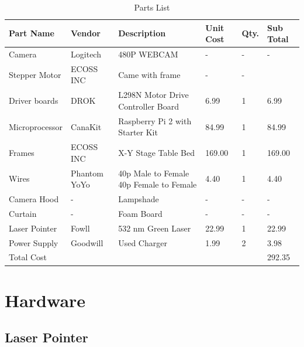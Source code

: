 \begin{table}[ht!]
\begin{center}	
\caption{Parts List}
\begin{tabular}{|l|p{1.5cm}|p{4cm}|l|l|l|}
\hline
Part Name & Vendor & Description  & Unit Cost & Qty. & Sub Total \\ \hline
Camera & Logitech & 480P WEBCAM & - & - & -\\ 
\hline
Stepper Motor & ECOSS INC & Came with frame & - & - &\\ 
\hline
Driver boards & DROK & L298N Motor Drive Controller Board & 6.99 & 1 & 6.99\\
\hline
Microprocessor & CanaKit & Raspberry Pi 2 with Starter Kit & 84.99 & 1 & 84.99\\
\hline
Frames & ECOSS INC & X-Y Stage Table Bed &  169.00 & 1 & 169.00\\
\hline
Wires & Phantom YoYo & 40p Male to Female 40p Female to Female & 4.40 & 1 & 4.40\\
\hline
Camera Hood & - & Lampshade & - & - & -\\
\hline
Curtain & - & Foam Board & - & - & -\\
\hline
Laser Pointer & Fowll & 532 nm Green Laser & 22.99 & 1 & 22.99\\
\hline
Power Supply & Goodwill & Used Charger & 1.99 & 2 & 3.98\\
\hline
Total Cost & & & & & 292.35\\
\hline
\end{tabular}
\end{center}
\end{table}


\section{Hardware}

\subsection{Laser Pointer}

